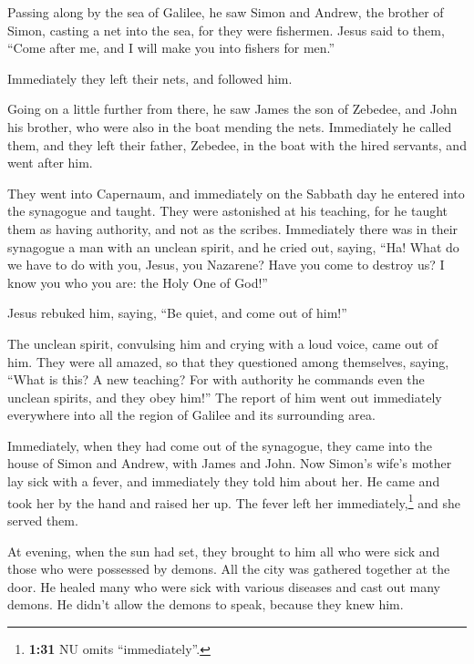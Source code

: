  Passing along by the sea of Galilee, he saw Simon and
Andrew, the brother of Simon, casting a net into the sea, for they were
fishermen.  Jesus said to them, ``Come after me, and I
will make you into fishers for men.''

 Immediately they left their nets, and followed him.

 Going on a little further from there, he saw James the
son of Zebedee, and John his brother, who were also in the boat mending
the nets.  Immediately he called them, and they left
their father, Zebedee, in the boat with the hired servants, and went
after him.

 They went into Capernaum, and immediately on the Sabbath
day he entered into the synagogue and taught.  They were
astonished at his teaching, for he taught them as having authority, and
not as the scribes.  Immediately there was in their
synagogue a man with an unclean spirit, and he cried out,
 saying, ``Ha! What do we have to do with you, Jesus, you
Nazarene? Have you come to destroy us? I know you who you are: the Holy
One of God!''

 Jesus rebuked him, saying, ``Be quiet, and come out of
him!''

 The unclean spirit, convulsing him and crying with a
loud voice, came out of him.  They were all amazed, so
that they questioned among themselves, saying, ``What is this? A new
teaching? For with authority he commands even the unclean spirits, and
they obey him!''  The report of him went out immediately
everywhere into all the region of Galilee and its surrounding area.

 Immediately, when they had come out of the synagogue,
they came into the house of Simon and Andrew, with James and John.
 Now Simon's wife's mother lay sick with a fever, and
immediately they told him about her.  He came and took
her by the hand and raised her up. The fever left her
immediately,\footnote{\textbf{1:31} NU omits ``immediately''.} and she
served them.

 At evening, when the sun had set, they brought to him
all who were sick and those who were possessed by demons.
 All the city was gathered together at the door.
 He healed many who were sick with various diseases and
cast out many demons. He didn't allow the demons to speak, because they
knew him.

